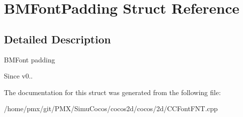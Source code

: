 \hypertarget{structBMFontPadding}{}\section{B\+M\+Font\+Padding Struct Reference}
\label{structBMFontPadding}


\subsection{Detailed Description}
B\+M\+Font padding \begin{DoxySince}{Since}
v0.. 
\end{DoxySince}


The documentation for this struct was generated from the following file\+:\begin{DoxyCompactItemize}
\item 
/home/pmx/git/\+P\+M\+X/\+Simu\+Cocos/cocos2d/cocos/2d/C\+C\+Font\+F\+N\+T.\+cpp\end{DoxyCompactItemize}
